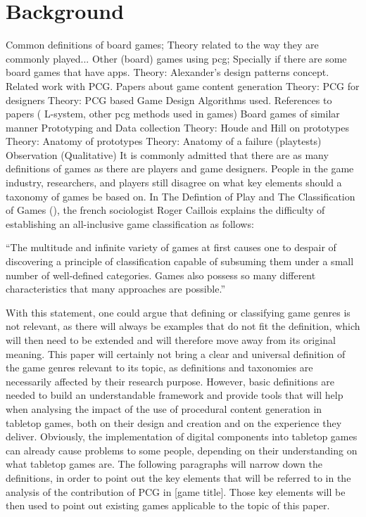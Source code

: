 \section{Background}
Common definitions of board games; Theory related to the way they are commonly played...
Other (board) games using pcg; Specially if there are some board games that have apps. 
Theory: Alexander's design patterns concept.
Related work with PCG.
Papers about game content generation
Theory: PCG for designers
Theory: PCG based Game Design
Algorithms used.
References to papers ( L-system, other pcg methods used in games)
Board games of similar manner
Prototyping and Data collection 
Theory: Houde and Hill on prototypes
Theory: Anatomy of prototypes
Theory: Anatomy of a failure (playtests)
Observation (Qualitative)
It is commonly admitted that there are as many definitions of games as there are players and game designers. People in the game industry, researchers, and players still disagree on what key elements should a taxonomy of games be based on. In The Defintion of Play and The Classification of Games (), the french sociologist Roger Caillois explains the difficulty of establishing an all-inclusive game classification as follows:

“The multitude and infinite variety of games at first causes one to despair of discovering a principle of classification capable of subsuming them under a small number of well-defined categories. Games also possess so many different characteristics that many approaches are possible.”

With this statement, one could argue that defining or classifying game genres is not relevant, as there will always be examples that do not fit the definition, which will then need to be extended and will therefore move away from its original meaning. This paper will certainly not bring a clear and universal definition of the game genres relevant to its topic, as definitions and taxonomies are necessarily affected by their research purpose. However, basic definitions are needed to build an understandable framework and provide tools that will help when analysing the impact of the use of procedural content generation in tabletop games, both on their design and creation and on the experience they deliver.
Obviously, the implementation of digital components into tabletop games can already cause problems to some people, depending on their understanding on what tabletop games are. The following paragraphs will narrow down the definitions, in order to point out the key elements that will be referred to in the analysis of the contribution of PCG in [game title]. Those key elements will be then used to point out existing games applicable to the topic of this paper.

